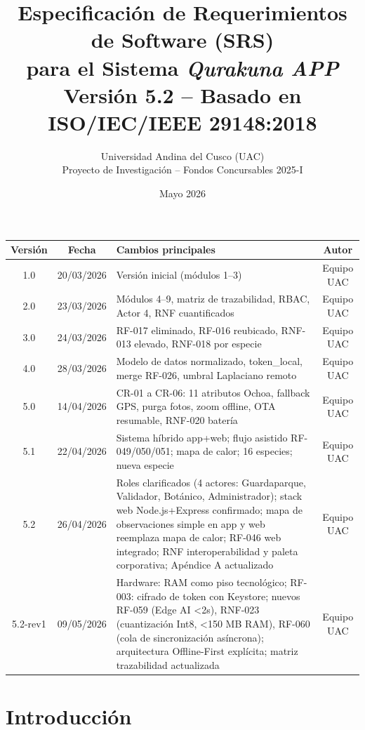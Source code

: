 \documentclass[12pt, a4paper]{article}
\title{
  \textbf{Especificaci\'on de Requerimientos de Software (SRS)\\
  para el Sistema \textit{Qurakuna APP}}\\[0.5em]
  \large Versi\'on 5.2 -- Basado en ISO/IEC/IEEE 29148:2018
}
\author{
  Universidad Andina del Cusco (UAC)\\
  Proyecto de Investigaci\'on -- Fondos Concursables 2025-I
}
\date{Mayo 2026}
\begin{document}
\maketitle
\thispagestyle{empty}

\begin{center}
\small
\begin{tabular}{|c|c|p{6.5cm}|c|}
\hline
\textbf{Versi\'on} & \textbf{Fecha} & \textbf{Cambios principales} & \textbf{Autor} \\
\hline
1.0 & 20/03/2026 & Versi\'on inicial (m\'odulos 1--3) & Equipo UAC \\
\hline
2.0 & 23/03/2026 & M\'odulos 4--9, matriz de trazabilidad, RBAC, Actor 4, RNF cuantificados & Equipo UAC \\
\hline
3.0 & 24/03/2026 & RF-017 eliminado, RF-016 reubicado, RNF-013 elevado, RNF-018 por especie & Equipo UAC \\
\hline
4.0 & 28/03/2026 & Modelo de datos normalizado, token\_local, merge RF-026, umbral Laplaciano remoto & Equipo UAC \\
\hline
5.0 & 14/04/2026 & CR-01 a CR-06: 11 atributos Ochoa, fallback GPS, purga fotos, zoom offline, OTA resumable, RNF-020 bater\'ia & Equipo UAC \\
\hline
5.1 & 22/04/2026 & Sistema h\'ibrido app+web; flujo asistido RF-049/050/051; mapa de calor; 16 especies; nueva especie & Equipo UAC \\
\hline
5.2 & 26/04/2026 & Roles clarificados (4 actores: Guardaparque, Validador, Bot\'anico, Administrador); stack web Node.js+Express confirmado; mapa de observaciones simple en app y web reemplaza mapa de calor; RF-046 web integrado; RNF interoperabilidad y paleta corporativa; Ap\'endice A actualizado & Equipo UAC \\
\hline
5.2-rev1 & 09/05/2026 & Hardware: RAM como piso tecnológico; RF-003: cifrado de token con Keystore; nuevos RF-059 (Edge AI <2s), RNF-023 (cuantización Int8, <150 MB RAM), RF-060 (cola de sincronización asíncrona); arquitectura Offline-First explícita; matriz trazabilidad actualizada & Equipo UAC \\
\hline
\end{tabular}
\end{center}

\newpage
\tableofcontents
\newpage

\section{Introducci\'on}
\end{document}
